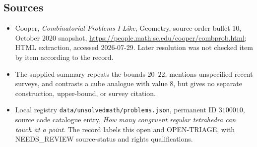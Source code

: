 \documentclass[11pt]{article}
\begin{document}
\subsection{Sources}
\begin{itemize}
\item Cooper, \emph{Combinatorial Problems I Like}, Geometry, source-order bullet 10, October 2020 snapshot, \url{https://people.math.sc.edu/cooper/combprob.html}; HTML extraction, accessed 2026-07-29. Later resolution was not checked item by item according to the record.
\item The supplied summary repeats the bounds $20$--$22$, mentions unspecified recent surveys, and contrasts a cube analogue with value $8$, but gives no separate construction, upper-bound, or survey citation.
\item Local registry \texttt{data/unsolvedmath/problems.json}, permanent ID $3100010$, source code catalogue entry, \emph{How many congruent regular tetrahedra can touch at a point}. The record labels this open and OPEN-TRIAGE, with NEEDS\_REVIEW source-status and rights qualifications.
\end{itemize}
\end{document}
